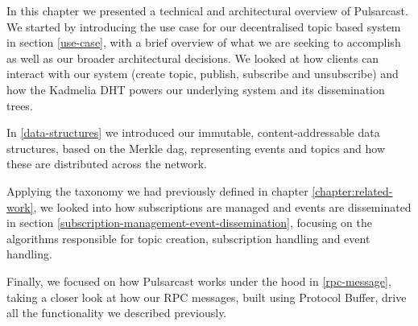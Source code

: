 In this chapter we presented a technical and architectural overview of
Pulsarcast. We started by introducing the use case for our decentralised topic
based system in section \ref{use-case}, with a brief overview of what we are
seeking to accomplish as well as our broader architectural decisions. We looked
at how clients can interact with our system (create topic, publish, subscribe
and unsubscribe) and how the Kadmelia DHT powers our underlying system and its
dissemination trees.

In \ref{data-structures} we introduced our immutable, content-addressable data
structures, based on the Merkle \acrshort{dag}, representing events and topics and how
these are distributed across the network.

Applying the taxonomy we had previously defined in chapter
\ref{chapter:related-work}, we looked into how subscriptions are managed and
events are disseminated in section
\ref{subscription-management-event-dissemination}, focusing on the algorithms
responsible for topic creation, subscription handling and event handling.

Finally, we focused on how Pulsarcast works under the hood in
\ref{rpc-message}, taking a closer look at how our RPC messages, built using
Protocol Buffer, drive all the functionality we described previously.

